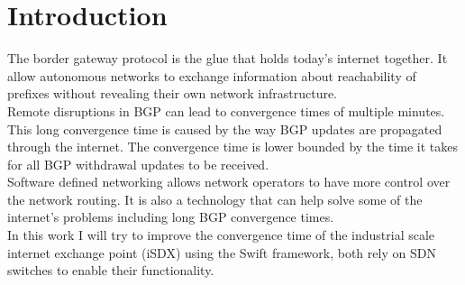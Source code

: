

\chapter{\label{introduction}Introduction}
The border gateway protocol is the glue that holds today's internet together. It allow autonomous networks to exchange information about reachability of prefixes without revealing their own network infrastructure. \\
Remote disruptions in BGP can lead to convergence times of multiple minutes. This long convergence time is caused by the way BGP updates are propagated through the internet. The convergence time is lower bounded by the time it takes for all BGP withdrawal updates to be received. \\
Software defined networking allows network operators to have more control over the network routing. It is also a technology that can help solve some of the internet's problems including long BGP convergence times. \\
In this work I will try to improve the convergence time of the industrial scale internet exchange point (iSDX) using the Swift framework, both rely on SDN switches to enable their functionality. 


